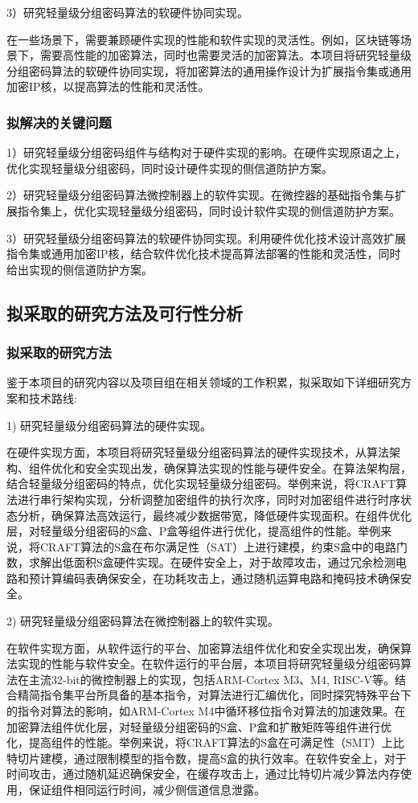 \documentclass{ctexart}
\begin{document}
3）研究轻量级分组密码算法的软硬件协同实现。

在一些场景下，需要兼顾硬件实现的性能和软件实现的灵活性。例如，区块链等场景下，需要高性能的加密算法，同时也需要灵活的加密算法。本项目将研究轻量级分组密码算法的软硬件协同实现，将加密算法的通用操作设计为扩展指令集或通用加密IP核，以提高算法的性能和灵活性。


\subsubsection{拟解决的关键问题}

1）研究轻量级分组密码组件与结构对于硬件实现的影响。在硬件实现原语之上，优化实现轻量级分组密码，同时设计硬件实现的侧信道防护方案。

2）研究轻量级分组密码算法微控制器上的软件实现。在微控器的基础指令集与扩展指令集上，优化实现轻量级分组密码，同时设计软件实现的侧信道防护方案。

3）研究轻量级分组密码算法的软硬件协同实现。利用硬件优化技术设计高效扩展指令集或通用加密IP核，结合软件优化技术提高算法部署的性能和灵活性，同时给出实现的侧信道防护方案。

\subsection{拟采取的研究方法及可行性分析}
\subsubsection{拟采取的研究方法}

鉴于本项目的研究内容以及项目组在相关领域的工作积累，拟采取如下详细研究方案和技术路线:

1) 研究轻量级分组密码算法的硬件实现。

在硬件实现方面，本项目将研究轻量级分组密码算法的硬件实现技术，从算法架构、组件优化和安全实现出发，确保算法实现的性能与硬件安全。在算法架构层，结合轻量级分组密码的特点，优化实现轻量级分组密码。举例来说，将CRAFT算法进行串行架构实现，分析调整加密组件的执行次序，同时对加密组件进行时序状态分析，确保算法高效运行，最终减少数据带宽，降低硬件实现面积。在组件优化层，对轻量级分组密码的S盒、P盒等组件进行优化，提高组件的性能。举例来说，将CRAFT算法的S盒在布尔满足性（SAT）上进行建模，约束S盒中的电路门数，求解出低面积S盒硬件实现。在硬件安全上，对于故障攻击，通过冗余检测电路和预计算编码表确保安全，在功耗攻击上，通过随机运算电路和掩码技术确保安全。

2) 研究轻量级分组密码算法在微控制器上的软件实现。

在软件实现方面，从软件运行的平台、加密算法组件优化和安全实现出发，确保算法实现的性能与软件安全。在软件运行的平台层，本项目将研究轻量级分组密码算法在主流32-bit的微控制器上的实现，包括ARM-Cortex M3、M4, RISC-V等。结合精简指令集平台所具备的基本指令，对算法进行汇编优化，同时探究特殊平台下的指令对算法的影响，如ARM-Cortex M4中循环移位指令对算法的加速效果。在加密算法组件优化层，对轻量级分组密码的S盒、P盒和扩散矩阵等组件进行优化，提高组件的性能。举例来说，将CRAFT算法的S盒在可满足性（SMT）上比特切片建模，通过限制模型的指令数，提高S盒的执行效率。在软件安全上，对于时间攻击，通过随机延迟确保安全，在缓存攻击上，通过比特切片减少算法内存使用，保证组件相同运行时间，减少侧信道信息泄露。
\end{document}
